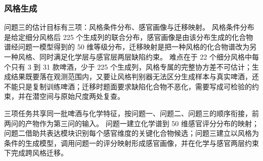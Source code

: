 \subsubsection{风格生成}

问题三的估计目标有三项：风格条件分布、感官画像与迁移映射。
风格条件分布是给定细分风格后 225 个生成列的联合分布，感官画像是由该分布生成的化合物谱经问题一模型得到的 50 维等级分布，迁移映射是把一种风格的化合物谱改为另一种风格、同时满足化学层与感官层两层缺陷约束。
难点在于 22 个细分风格中每个只有 3 到 31 款啤酒，少于 225 个生成列，风格专属的完整协方差不可估计；生成结果既要落在观测范围内，又要让风格判别器无法区分生成样本与真实啤酒，还不能只是复制训练啤酒；迁移时题面要求缺陷化合物不恶化，需要写成可检验的约束，并在潜空间与原始尺度两处复查。

三项任务共享同一批啤酒与化学特征，按问题一、问题二、问题三的顺序衔接，前两问的产物作为第三问的输入。
问题一建立化学谱到 50 维感官评分分布的映射；问题二借助共表达模块识别每个感官维度的关键化合物候选；问题三建立以风格为条件的生成模型，调用问题一的评分映射形成感官画像，并在化学与感官两层约束下完成跨风格迁移。
